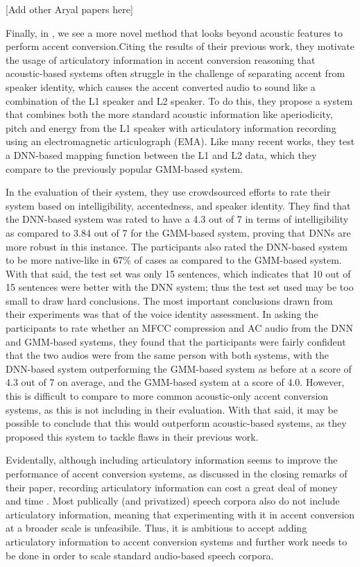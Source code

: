 \documentclass
[
    a4paper,
    twoside,
    12pt
]
{report}
\begin{document}
{[}Add other Aryal papers here{]}

Finally, in \textcite{aryal2015}, we see a more novel method that looks
beyond acoustic features to perform accent conversion.Citing the results
of their previous work, they motivate the usage of articulatory
information in accent conversion reasoning that acoustic-based systems
often struggle in the challenge of separating accent from speaker
identity, which causes the accent converted audio to sound like a
combination of the L1 speaker and L2 speaker. To do this, they propose a
system that combines both the more standard acoustic information like
aperiodicity, pitch and energy from the L1 speaker with articulatory
information recording using an electromagnetic articulograph (EMA). Like
many recent works, they test a DNN-based mapping function between the L1
and L2 data, which they compare to the previously popular GMM-based
system.

In the evaluation of their system, they use crowdsourced efforts to rate
their system based on intelligibility, accentedness, and speaker
identity. They find that the DNN-based system was rated to have a 4.3
out of 7 in terms of intelligibility as compared to 3.84 out of 7 for
the GMM-based system, proving that DNNs are more robust in this
instance. The participants also rated the DNN-based system to be more
native-like in 67\% of cases as compared to the GMM-based system. With
that said, the test set was only 15 sentences, which indicates that 10
out of 15 sentences were better with the DNN system; thus the test set
used may be too small to draw hard conclusions. The most important
conclusions drawn from their experiments was that of the voice identity
assessment. In asking the participants to rate whether an MFCC
compression and AC audio from the DNN and GMM-based systems, they found
that the participants were fairly confident that the two audios were
from the same person with both systems, with the DNN-based system
outperforming the GMM-based system as before at a score of 4.3 out of 7
on average, and the GMM-based system at a score of 4.0. However, this is
difficult to compare to more common acoustic-only accent conversion
systems, as this is not including in their evaluation. With that said,
it may be possible to conclude that this would outperform acoustic-based
systems, as they proposed this system to tackle flaws in their previous
work.

Evidentally, although including articulatory information seems to
improve the performance of accent conversion systems, as discussed in
the closing remarks of their paper, recording articulatory information
can cost a great deal of money and time \parencite{aryal2015}. Most
publically (and privatized) speech corpora also do not include
articulatory information, meaning that experimenting with it in accent
conversion at a broader scale is unfeasibile. Thus, it is ambitious to
accept adding articulatory information to accent conversion systems and
further work needs to be done in order to scale standard audio-based
speech corpora.
\end{document}
